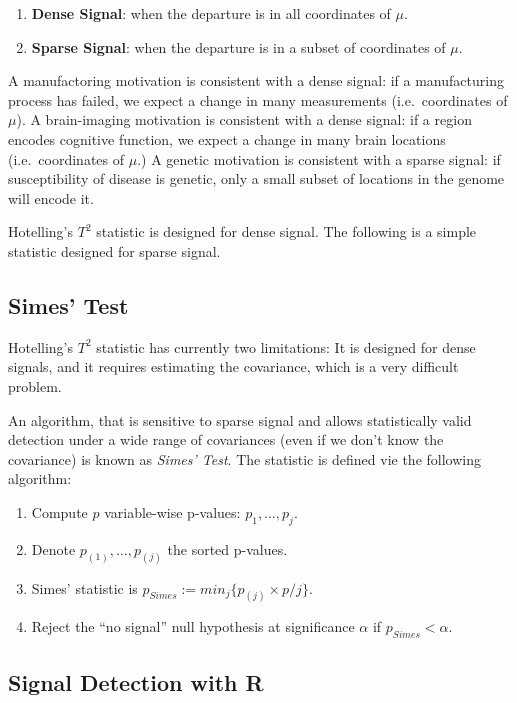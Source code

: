 \documentclass[]{book}
\providecommand{\tightlist}{%
  \setlength{\itemsep}{0pt}\setlength{\parskip}{0pt}}
\theoremstyle{definition}
\theoremstyle{definition}
\theoremstyle{definition}
\theoremstyle{remark}
\begin{document}
\begin{enumerate}
\def\labelenumi{\arabic{enumi}.}
\tightlist
\item
  \textbf{Dense Signal}: when the departure is in all coordinates of
  \(\mu\).
\item
  \textbf{Sparse Signal}: when the departure is in a subset of
  coordinates of \(\mu\).
\end{enumerate}

A manufactoring motivation is consistent with a dense signal: if a
manufacturing process has failed, we expect a change in many
measurements (i.e.~coordinates of \(\mu\)). A brain-imaging motivation
is consistent with a dense signal: if a region encodes cognitive
function, we expect a change in many brain locations (i.e.~coordinates
of \(\mu\).) A genetic motivation is consistent with a sparse signal: if
susceptibility of disease is genetic, only a small subset of locations
in the genome will encode it.

Hotelling's \(T^2\) statistic is designed for dense signal. The
following is a simple statistic designed for sparse signal.

\subsection{Simes' Test}\label{simes-test}

Hotelling's \(T^2\) statistic has currently two limitations: It is
designed for dense signals, and it requires estimating the covariance,
which is a very difficult problem.

An algorithm, that is sensitive to sparse signal and allows
statistically valid detection under a wide range of covariances (even if
we don't know the covariance) is known as \emph{Simes' Test}. The
statistic is defined vie the following algorithm:

\begin{enumerate}
\def\labelenumi{\arabic{enumi}.}
\tightlist
\item
  Compute \(p\) variable-wise p-values: \(p_1,\dots,p_j\).
\item
  Denote \(p_{(1)},\dots,p_{(j)}\) the sorted p-values.
\item
  Simes' statistic is \(p_{Simes}:=min_j\{p_{(j)} \times p/j\}\).
\item
  Reject the ``no signal'' null hypothesis at significance \(\alpha\) if
  \(p_{Simes}<\alpha\).
\end{enumerate}

\subsection{Signal Detection with R}\label{signal-detection-with-r}
\end{document}
